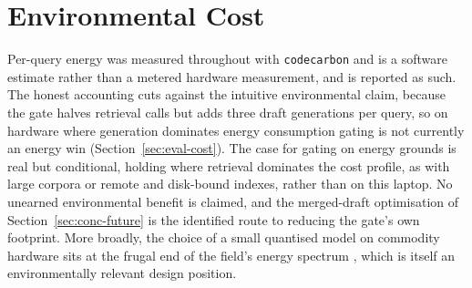 \section{Environmental Cost}
\label{sec:lsep-energy}

Per-query energy was measured throughout with \texttt{codecarbon} and is a
software estimate rather than a metered hardware measurement, and is reported
as such. The honest accounting cuts against the intuitive environmental claim,
because the gate halves retrieval calls but adds three draft generations per
query, so on hardware where generation dominates energy consumption gating is
not currently an energy win (Section~\ref{sec:eval-cost}). The case for
gating on energy grounds is real but conditional, holding where retrieval
dominates the cost profile, as with large corpora or remote and disk-bound
indexes, rather than on this laptop. No unearned environmental benefit is
claimed, and the merged-draft optimisation of Section~\ref{sec:conc-future} is
the identified route to reducing the gate's own footprint. More broadly, the
choice of a small quantised model on commodity hardware sits at the frugal end
of the field's energy spectrum \citep{strubell2019}, which is itself an
environmentally relevant design position.